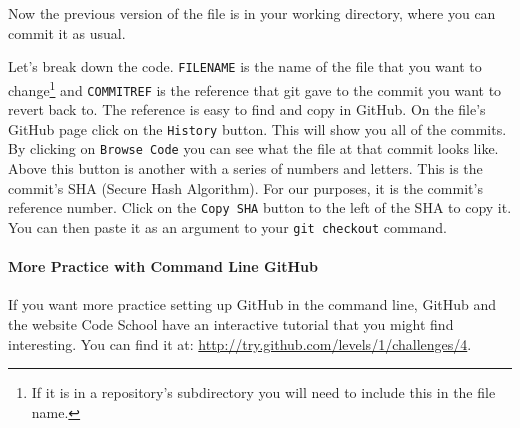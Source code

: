 \noindent Now the previous version of the file is in your working directory, where you can commit it as usual.

Let's break down the code.  {\tt{FILENAME}} is the name of the file that you want to change\footnote{If it is in a repository's subdirectory you will need to include this in the file name.} and {\tt{COMMITREF}} is the reference that git gave to the commit you want to revert back to. The reference is easy to find and copy in GitHub. On the file's GitHub page click on the {\tt{History}} button. This will show you all of the commits. By clicking on {\tt{Browse Code}} you can see what the file at that commit looks like. Above this button is another with a series of numbers and letters. This is the commit's SHA (Secure Hash Algorithm). For our purposes, it is the commit's reference number. Click on the {\tt{Copy SHA}} button to the left of the SHA to copy it. You can then paste it as an argument to your {\tt{git checkout}} command. 

\paragraph{More Practice with Command Line GitHub}

If you want more practice setting up GitHub in the command line, GitHub and the website Code School have an interactive tutorial that you might find interesting. You can find it at: \url{http://try.github.com/levels/1/challenges/4}.
